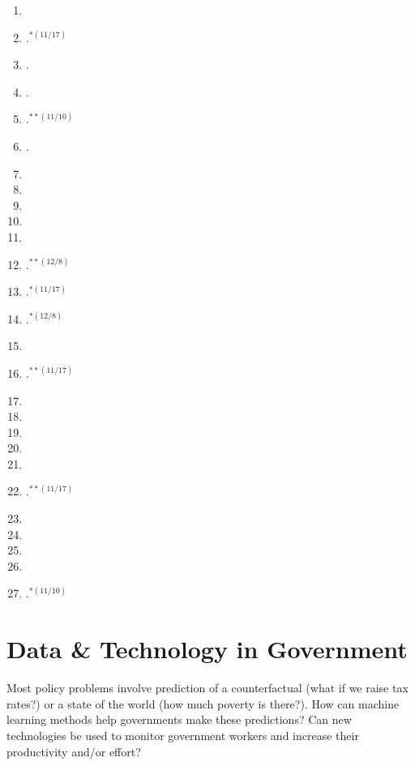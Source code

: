 \documentclass[11pt]{article}
\begin{document}

\begin{enumerate}
\item {}
\item {}.$^{*(11/17)}$
\item {}.
\item {}.
\item \textbf{}.$^{**(11/10)}$
\item {}.
\item {}
\item {}
\item {}
\item {}
\item {}
\item \textbf{}.$^{**(12/8)}$
\item {}.$^{*(11/17)}$
\item {}.$^{*(12/8)}$
\item {}
\item \textbf{}.$^{**(11/17)}$
\item {}
\item {}
\item {}
\item {}
\item {}
\item \textbf{}.$^{**(11/17)}$
\item {}
\item {}
\item {}
\item {}
\item {}.$^{*(11/10)}$
\end{enumerate}

\section{Data \& Technology in Government}
Most policy problems involve prediction of a counterfactual (what if we raise tax rates?) or a state of the world (how much poverty is there?). How can machine learning methods help governments make these predictions? Can new technologies be used to monitor government workers and increase their productivity and/or effort?
\end{document}
